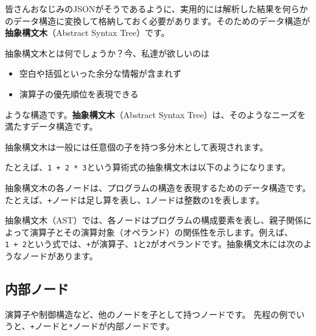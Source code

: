 皆さんおなじみのJSONがそうであるように、実用的には解析した結果を何らかのデータ構造に変換して格納しておく必要があります。そのためのデータ構造が\textbf{抽象構文木}（Abstract
Syntax Tree）です。

抽象構文木とは何でしょうか？今、私達が欲しいのは

\begin{itemize}
\tightlist
\item
  空白や括弧といった余分な情報が含まれず
\item
  演算子の優先順位を表現できる
\end{itemize}

ような構造です。\textbf{抽象構文木}（Abstract Syntax
Tree）は、そのようなニーズを満たすデータ構造です。

抽象構文木は一般には任意個の子を持つ多分木として表現されます。

たとえば、\texttt{1\ +\ 2\ *\ 3}という算術式の抽象構文木は以下のようになります。

\begin{center}
\end{center}

抽象構文木の各ノードは、プログラムの構造を表現するためのデータ構造です。たとえば、\texttt{+}ノードは足し算を表し、\texttt{1}ノードは整数の\texttt{1}を表します。

抽象構文木（AST）では、各ノードはプログラムの構成要素を表し、親子関係によって演算子とその演算対象（オペランド）の関係性を示します。例えば、\texttt{1\ +\ 2}という式では、\texttt{+}が演算子、\texttt{1}と\texttt{2}がオペランドです。抽象構文木には次のようなノードがあります。

\hypertarget{chapter2-ux5185ux90e8ux30ceux30fcux30c9}{%
\subsection{内部ノード}\label{chapter2-ux5185ux90e8ux30ceux30fcux30c9}}

演算子や制御構造など、他のノードを子として持つノードです。
先程の例でいうと、\texttt{+}ノードと\texttt{*}ノードが内部ノードです。

